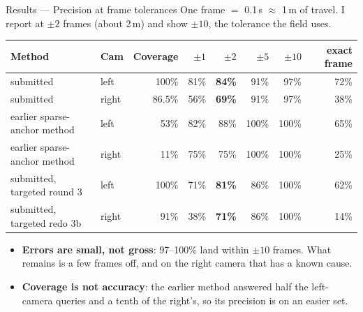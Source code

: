 \documentclass[10pt,aspectratio=169]{beamer}
\begin{document}
\begin{frame}{Results --- Precision at frame tolerances}
{\small One frame $=$ 0.1\,s $\approx$ 1\,m of travel. I report at $\pm2$ frames (about 2\,m) and show $\pm10$, the tolerance the field uses.}
\vspace{2pt}
\begin{center}\small
\begin{tabular}{llrrrrrr}
\toprule
Method & Cam & Coverage & $\pm1$ & $\pm2$ & $\pm5$ & $\pm10$ & exact frame \\
\midrule
submitted & left & 100\% & 81\% & \textbf{84\%} & 91\% & 97\% & 72\% \\
submitted & right & 86.5\% & 56\% & \textbf{69\%} & 91\% & 97\% & 38\% \\
earlier sparse-anchor method & left & 53\% & 82\% & 88\% & 100\% & 100\% & 65\% \\
earlier sparse-anchor method & right & 11\% & 75\% & 75\% & 100\% & 100\% & 25\% \\
submitted, targeted round 3 & left & 100\% & 71\% & \textbf{81\%} & 86\% & 100\% & 62\% \\
submitted, targeted redo 3b & right & 91\% & 38\% & \textbf{71\%} & 86\% & 100\% & 14\% \\
\bottomrule
\end{tabular}
\end{center}
\begin{itemize}
  \item \textbf{Errors are small, not gross}: 97--100\% land within $\pm10$ frames. What remains is a few frames off, and on the right camera that has a known cause.
  \item \textbf{Coverage is not accuracy}: the earlier method answered half the left-camera queries and a tenth of the right's, so its precision is on an easier set.
\end{itemize}
\end{frame}
\end{document}
